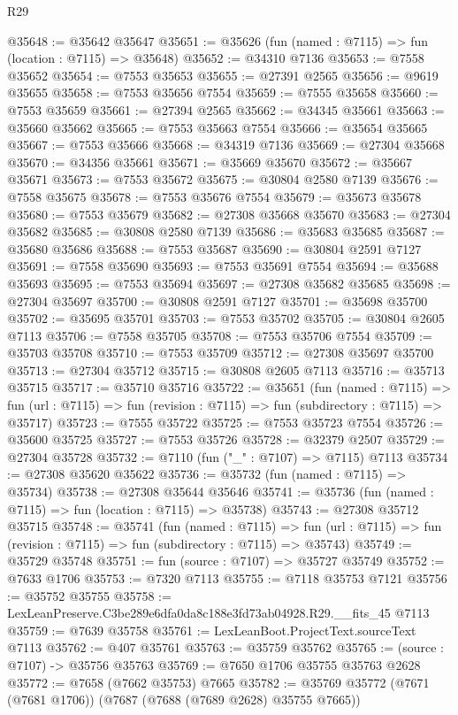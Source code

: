 \begin{lexlean}{R29}
\begin{coremodule}
@35648 := @35642 @35647
@35651 := @35626 (fun (named : @7115) => fun (location : @7115) => @35648)
@35652 := @34310 @7136
@35653 := @7558 @35652
@35654 := @7553 @35653
@35655 := @27391 @2565
@35656 := @9619 @35655
@35658 := @7553 @35656 @7554
@35659 := @7555 @35658
@35660 := @7553 @35659
@35661 := @27394 @2565
@35662 := @34345 @35661
@35663 := @35660 @35662
@35665 := @7553 @35663 @7554
@35666 := @35654 @35665
@35667 := @7553 @35666
@35668 := @34319 @7136
@35669 := @27304 @35668
@35670 := @34356 @35661
@35671 := @35669 @35670
@35672 := @35667 @35671
@35673 := @7553 @35672
@35675 := @30804 @2580 @7139
@35676 := @7558 @35675
@35678 := @7553 @35676 @7554
@35679 := @35673 @35678
@35680 := @7553 @35679
@35682 := @27308 @35668 @35670
@35683 := @27304 @35682
@35685 := @30808 @2580 @7139
@35686 := @35683 @35685
@35687 := @35680 @35686
@35688 := @7553 @35687
@35690 := @30804 @2591 @7127
@35691 := @7558 @35690
@35693 := @7553 @35691 @7554
@35694 := @35688 @35693
@35695 := @7553 @35694
@35697 := @27308 @35682 @35685
@35698 := @27304 @35697
@35700 := @30808 @2591 @7127
@35701 := @35698 @35700
@35702 := @35695 @35701
@35703 := @7553 @35702
@35705 := @30804 @2605 @7113
@35706 := @7558 @35705
@35708 := @7553 @35706 @7554
@35709 := @35703 @35708
@35710 := @7553 @35709
@35712 := @27308 @35697 @35700
@35713 := @27304 @35712
@35715 := @30808 @2605 @7113
@35716 := @35713 @35715
@35717 := @35710 @35716
@35722 := @35651
    (fun (named : @7115) =>
    fun (url : @7115) => fun (revision : @7115) => fun (subdirectory : @7115) => @35717)
@35723 := @7555 @35722
@35725 := @7553 @35723 @7554
@35726 := @35600 @35725
@35727 := @7553 @35726
@35728 := @32379 @2507
@35729 := @27304 @35728
@35732 := @7110 (fun ("_" : @7107) => @7115) @7113
@35734 := @27308 @35620 @35622
@35736 := @35732 (fun (named : @7115) => @35734)
@35738 := @27308 @35644 @35646
@35741 := @35736 (fun (named : @7115) => fun (location : @7115) => @35738)
@35743 := @27308 @35712 @35715
@35748 := @35741
    (fun (named : @7115) =>
    fun (url : @7115) => fun (revision : @7115) => fun (subdirectory : @7115) => @35743)
@35749 := @35729 @35748
@35751 := fun (source : @7107) => @35727 @35749
@35752 := @7633 @1706
@35753 := @7320 @7113
@35755 := @7118 @35753 @7121
@35756 := @35752 @35755
@35758 := LexLeanPreserve.C3be289e6dfa0da8c188e3fd73ab04928.R29.__fits_45 @7113
@35759 := @7639 @35758
@35761 := LexLeanBoot.ProjectText.sourceText @7113
@35762 := @407 @35761
@35763 := @35759 @35762
@35765 := (source : @7107) -> @35756 @35763
@35769 := @7650 @1706 @35755 @35763 @2628
@35772 := @7658 (@7662 @35753) @7665
@35782 := @35769 @35772 (@7671 (@7681 @1706)) (@7687 (@7688 (@7689 @2628) @35755 @7665))

\end{coremodule}
\end{lexlean}
